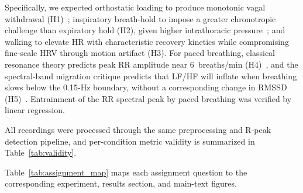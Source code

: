 \documentclass[conference]{IEEEtran}
\begin{document}
Specifically, we expected orthostatic loading to produce monotonic
vagal withdrawal (H1)~\cite{taskforce1996,shaffer2017}; inspiratory
breath-hold to impose a greater chronotropic challenge than expiratory
hold (H2), given higher intrathoracic pressure~\cite{berntson1997};
and walking to elevate HR with characteristic recovery kinetics while
compromising fine-scale HRV through motion artifact (H3).
For paced breathing, classical resonance theory predicts peak RR
amplitude near 6~breaths/min (H4)~\cite{lehrer2014}, and the
spectral-band migration critique predicts that LF/HF will inflate
when breathing slows below the 0.15-Hz boundary, without a
corresponding change in RMSSD (H5)~\cite{billman2013,eckberg1997}.
Entrainment of the RR spectral peak by paced breathing was verified
by linear regression.

All recordings were processed through the same preprocessing and
R-peak detection pipeline, and per-condition metric validity is
summarized in Table~\ref{tab:validity}.

Table~\ref{tab:assignment_map} maps each assignment question to the
corresponding experiment, results section, and main-text figures.

\begin{table}[h]
\caption{Assignment Requirements and Corresponding Analyses}
\label{tab:assignment_map}
\centering
{}
\end{table}


\end{document}
